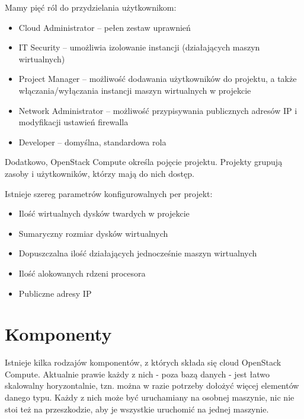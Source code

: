 Mamy pięć ról do przydzielania użytkownikom\cite{nova_manual}:

\begin{itemize}
\item Cloud Administrator -- pełen zestaw uprawnień
\item IT Security -- umożliwia izolowanie instancji (działających maszyn wirtualnych)
\item Project Manager -- możliwość dodawania użytkowników do projektu, a także włączania/wyłączania instancji maszyn wirtualnych w projekcie
\item Network Administrator -- możliwość przypisywania publicznych adresów IP i modyfikacji ustawień firewalla
\item Developer -- domyślna, standardowa rola
\end{itemize}

Dodatkowo, OpenStack Compute określa pojęcie projektu. Projekty grupują zasoby i użytkowników, którzy mają do nich dostęp.

Istnieje szereg parametrów konfigurowalnych per projekt\cite{nova_manual}:

\begin{itemize}
\item Ilość wirtualnych dysków twardych w projekcie
\item Sumaryczny rozmiar dysków wirtualnych
\item Dopuszczalna ilość działających jednocześnie maszyn wirtualnych
\item Ilość alokowanych rdzeni procesora
\item Publiczne adresy IP
\end{itemize}

\section{Komponenty}

Istnieje kilka rodzajów komponentów, z których składa się cloud OpenStack Compute\cite{nova_manual}.
Aktualnie prawie każdy z nich - poza bazą danych - jest łatwo skalowalny horyzontalnie, tzn. można w razie potrzeby dołożyć więcej elementów danego typu. Każdy z nich może być uruchamiany na osobnej maszynie, nic nie stoi też na przeszkodzie, aby je wszystkie uruchomić na jednej maszynie.

